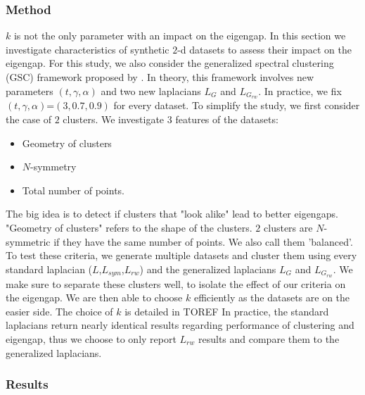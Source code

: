 \documentclass[a4paper,12pt]{article}
\theoremstyle{definition}
\theoremstyle{plain}
\begin{document}
\subsubsection{Method}
$k$ is not the only parameter with an impact on the eigengap. In this section we investigate characteristics of synthetic $2$-d datasets to assess their impact on the eigengap. For this study, we also consider the generalized spectral clustering (GSC) framework proposed by \cite[Jonckheere et.al]{GSC}. In theory, this framework involves new parameters $(t,\gamma,\alpha)$ and two new laplacians $L_{G}$ and $L_{G_{rw}}$. In practice, we fix $(t,\gamma,\alpha)$=$(3,0.7,0.9)$ for every dataset. To simplify the study, we first consider the case of $2$ clusters. We investigate $3$ features of the datasets:
\begin{itemize}
	\item Geometry of clusters
	\item $N$-symmetry
	\item Total number of points.
\end{itemize}
The big idea is to detect if clusters that "look alike" lead to better eigengaps. 
"Geometry of clusters" refers to the shape of the clusters. $2$ clusters are $N$-symmetric if they have the same number of points. We also call them 'balanced'.
To test these criteria, we generate multiple datasets and cluster them using every standard laplacian ($L$,$L_{sym}$,$L_{rw}$) and the generalized laplacians $L_G$ and $L_{G_{rw}}$. We make sure to separate these clusters well, to isolate the effect of our criteria on the eigengap. We are then able to choose $k$ efficiently as the datasets are on the easier side. The choice of $k$ is detailed in TOREF In practice, the standard laplacians return nearly identical results regarding performance of clustering and eigengap, thus we choose to only report $L_{rw}$ results and compare them to the generalized laplacians.
\subsubsection{Results}
\end{document}
